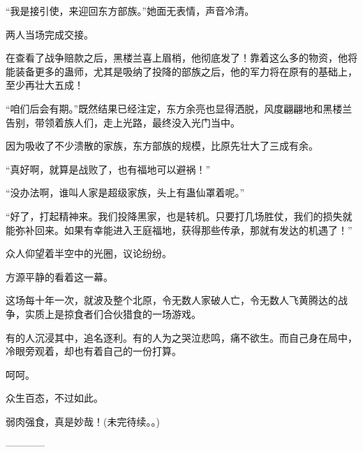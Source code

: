 \begin{this_body}
“我是接引使，来迎回东方部族。”她面无表情，声音冷清。

两人当场完成交接。

在查看了战争赔款之后，黑楼兰喜上眉梢，他彻底发了！靠着这么多的物资，他将能装备更多的蛊师，尤其是吸纳了投降的部族之后，他的军力将在原有的基础上，至少再壮大五成！

“咱们后会有期。”既然结果已经注定，东方余亮也显得洒脱，风度翩翩地和黑楼兰告别，带领着族人们，走上光路，最终没入光门当中。

因为吸收了不少溃散的家族，东方部族的规模，比原先壮大了三成有余。

“真好啊，就算是战败了，也有福地可以避祸！”

“没办法啊，谁叫人家是超级家族，头上有蛊仙罩着呢。”

“好了，打起精神来。我们投降黑家，也是转机。只要打几场胜仗，我们的损失就能弥补回来。如果有幸能进入王庭福地，获得那些传承，那就有发达的机遇了！”

众人仰望着半空中的光圈，议论纷纷。

方源平静的看着这一幕。

这场每十年一次，就波及整个北原，令无数人家破人亡，令无数人飞黄腾达的战争，实质上是掠食者们合伙猎食的一场游戏。

有的人沉浸其中，追名逐利。有的人为之哭泣悲鸣，痛不欲生。而自己身在局中，冷眼旁观着，却也有着自己的一份打算。

呵呵。

众生百态，不过如此。

弱肉强食，真是妙哉！(未完待续。。)

------------

\end{this_body}

